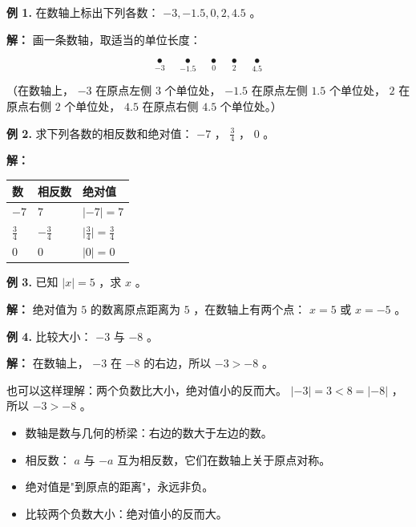 \begin{workedexamples}


\textbf{例 1.} 在数轴上标出下列各数： $-3, -1.5, 0, 2, 4.5$ 。

\textbf{解：} 画一条数轴，取适当的单位长度：

\[
\underset{-3}{\bullet} \quad \underset{-1.5}{\bullet} \quad \underset{0}{\bullet} \quad \underset{2}{\bullet} \quad \underset{4.5}{\bullet}
\]


（在数轴上， $-3$ 在原点左侧 $3$ 个单位处， $-1.5$ 在原点左侧 $1.5$ 个单位处， $2$ 在原点右侧 $2$ 个单位处， $4.5$ 在原点右侧 $4.5$ 个单位处。）

\textbf{例 2.} 求下列各数的相反数和绝对值： $-7$ ， $\frac{3}{4}$ ， $0$ 。

\textbf{解：}

\begin{center}
\begin{tabular}{lll}
\toprule
数 & 相反数 & 绝对值 \\
\midrule
$-7$ & $7$ & $\lvert -7 \rvert = 7$ \\
$\frac{3}{4}$ & $-\frac{3}{4}$ & $\lvert \frac{3}{4} \rvert = \frac{3}{4}$ \\
$0$ & $0$ & $\lvert 0 \rvert = 0$ \\
\bottomrule
\end{tabular}
\end{center}


\textbf{例 3.} 已知 $\lvert x \rvert = 5$ ，求 $x$ 。

\textbf{解：} 绝对值为 $5$ 的数离原点距离为 $5$ ，在数轴上有两个点： $x = 5$ 或 $x = -5$ 。

\textbf{例 4.} 比较大小： $-3$ 与 $-8$ 。

\textbf{解：} 在数轴上， $-3$ 在 $-8$ 的右边，所以 $-3 > -8$ 。

也可以这样理解：两个负数比大小，绝对值小的反而大。 $\lvert -3 \rvert = 3 < 8 = \lvert -8 \rvert$ ，所以 $-3 > -8$ 。

\end{workedexamples}

\begin{keytakeaway}


\begin{itemize}
  \item 数轴是数与几何的桥梁：右边的数大于左边的数。
  \item 相反数： $a$ 与 $-a$ 互为相反数，它们在数轴上关于原点对称。
  \item 绝对值是"到原点的距离"，永远非负。
  \item 比较两个负数大小：绝对值小的反而大。
\end{itemize}


\end{keytakeaway}

